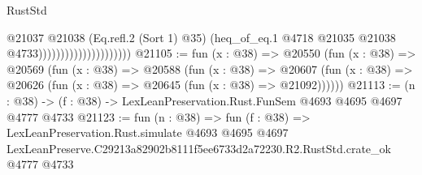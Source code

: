 \begin{lexlean}{RustStd}
\begin{coremodule}
                                          @21037
                                            @21038
                                            (Eq.refl.{2} (Sort 1) @35)
                                            (heq_of_eq.{1}
                                              @4718
                                              @21035
                                              @21038
                                              @4733)))))))))))))))))))))
@21105 := fun (x : @38) =>
  @20550
    (fun (x : @38) =>
    @20569
      (fun (x : @38) =>
      @20588
        (fun (x : @38) =>
        @20607 (fun (x : @38) => @20626 (fun (x : @38) => @20645 (fun (x : @38) => @21092))))))
@21113 := (n : @38) -> (f : @38) -> LexLeanPreservation.Rust.FunSem @4693 @4695 @4697 @4777 @4733
@21123 := fun (n : @38) =>
  fun (f : @38) =>
  LexLeanPreservation.Rust.simulate
    @4693
    @4695
    @4697
    LexLeanPreserve.C29213a82902b8111f5ee6733d2a72230.R2.RustStd.crate_ok
    @4777
    @4733
\end{coremodule}
\end{lexlean}
